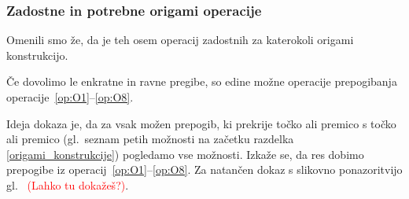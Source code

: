 
\subsubsection{Zadostne in potrebne origami operacije}
\label{podpogl:zadost_potr_op}

Omenili smo že, da je teh osem operacij zadostnih za katerokoli origami konstrukcijo.

\begin{izrek}
    \label{izr:op1do8}
    Če dovolimo le enkratne in ravne pregibe, so edine možne operacije prepogibanja operacije~\ref{op:O1}--\ref{op:O8}.
\end{izrek}

Ideja dokaza je, da za vsak možen prepogib, ki prekrije točko ali premico s točko ali premico (gl.\ seznam petih možnosti na začetku razdelka \ref{origami_konstrukcije}) pogledamo vse možnosti. Izkaže se, da res dobimo prepogibe iz operacij~\ref{op:O1}--\ref{op:O8}. Za natančen dokaz s slikovno ponazoritvijo gl.\ \cite[str.\ 24--26 (izrek 1.1)]{hull2020} \textcolor{red}{(Lahko tu dokažeš?)}.

